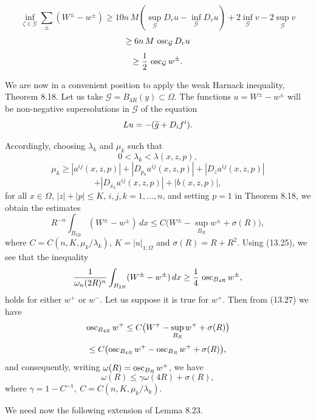 \begin{equation}\tag{13.25}
\inf_{\zeta\in\mathcal{G}}\sum_{\pm}\left(W^{\pm}-w^{\pm}\right)\geq 10n\,M\left(\sup_{\mathcal{G}}D_ru-\inf_{\mathcal{G}}D_ru\right)+2\inf_{\mathcal{G}}v-2\sup_{\mathcal{G}}v
\end{equation}
\[
\geq 6n\,M\,\operatorname{osc}_{\mathcal{G}}D_ru
\]
\[
\geq \frac{1}{2}\,\operatorname{osc}_{\mathcal{G}}w^{\pm}.
\]

We are now in a convenient position to apply the weak Harnack inequality, Theorem 8.18. Let us take $\mathcal{G}=B_{4R}(y)\subset \Omega$. The functions $u=W^{\pm}-w^{\pm}$ will be non-negative supersolutions in $\mathcal{G}$ of the equation
\[
Lu=-(\widetilde g+D_i f^i).
\]

Accordingly, choosing $\lambda_k$ and $\mu_k$ such that
\[
0<\lambda_k<\lambda(x,z,p),
\]
\begin{equation}\tag{13.26}
\mu_k\geq |a^{ij}(x,z,p)|+\left|D_{p_k}a^{ij}(x,z,p)\right|+\left|D_z a^{ij}(x,z,p)\right|
\end{equation}
\[
+\left|D_{x_k}a^{ij}(x,z,p)\right|+|b(x,z,p)|,
\]
for all $x\in \Omega$, $|z|+|p|\leq K$, $i,j,k=1,\ldots,n$, and setting $p=1$ in Theorem 8.18, we obtain the estimates
\begin{equation}\tag{13.27}
R^{-n}\int_{B_{2R}}(W^{\pm}-w^{\pm})\,dx\leq C\bigl(W^{\pm}-\sup_{B_R}w^{\pm}+\sigma(R)\bigr),
\end{equation}
where $C=C(n,K,\mu_k/\lambda_k)$, $K=|u|_{1;\Omega}$ and $\sigma(R)=R+R^2$. Using (13.25), we see that the inequality
\[
\frac{1}{\omega_n(2R)^n}\int_{B_{2R}}(W^{\pm}-w^{\pm})\,dx\geq \frac{1}{4}\,\operatorname{osc}_{B_{4R}}w^{\pm},
\]
holds for either $w^+$ or $w^-$. Let us suppose it is true for $w^+$. Then from (13.27) we have
\[
\operatorname{osc}_{B_{4R}}w^+\leq C\bigl(W^+-\sup_{B_R}w^++\sigma(R)\bigr)
\]
\[
\leq C\bigl(\operatorname{osc}_{B_{4R}}w^+-\operatorname{osc}_{B_R}w^++\sigma(R)\bigr),
\]
and consequently, writing $\omega(R)=\operatorname{osc}_{B_R}w^+$, we have
\[
\omega(R)\leq \gamma\omega(4R)+\sigma(R),
\]
where $\gamma=1-C^{-1},\ C=C(n,K,\mu_k/\lambda_k)$.

We need now the following extension of Lemma 8.23.



